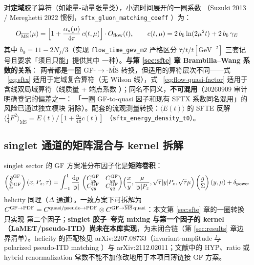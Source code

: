 \documentclass[11pt,a4paper]{ctexart}
\newcommand{\MSbarM}{\overline{\text{MS}}}
\newcommand{\abs}[1]{\lvert #1\rvert}
\newcommand{\code}[1]{\texttt{#1}}
\newcommand{\zzh}{\widehat{\tau}}
\begin{document}
对\textbf{定域}胶子算符（如能量-动量张量类），小流时间展开的一圈系数
（Suzuki 2013 / Mereghetti 2022 惯例，\code{sftx\_gluon\_matching\_coeff}
）为：
\begin{equation}\label{eq:sftx}
O_{\MSbarM}(\mu) = \Bigl[1 + \frac{\alpha_s(\mu)}{4\pi}\,c(t,\mu)\Bigr]
\cdot O_{\rm flow}(t),
\qquad
c(t,\mu) = 2\,b_0\ln(2\mu^2 t) + 2\,b_0\,\gamma_E
\end{equation}
其中 $b_0=11-2N_f/3$（实现 \code{flow\_time\_gev\_m2} 严格区分
$\zzh$/$t$/$t[\mathrm{GeV}^{-2}]$ 三套记号且要求「须且只能」提供其中
一种）。\textbf{与第 \ref{sec:sfte} 章 Brambilla--Wang 系数的关系}：
两者都是一圈 GF-$\to$-$\MSbarM$ 转换，但适用的算符层次不同——式
~\eqref{eq:sftx} 适用于定域复合算符（无 Wilson 线），式
~\eqref{eq:flow-quasi-factor} 适用于含线双局域算符（线质量 + 端点系数
）；同名不同义，\textbf{不可混用}（20260909 审计明确登记的偏差之一：
「一圈 GF-to-quasi 因子和现有 SFTX 系数同名混用」的风险已通过独立模块
消除）。配套的流观测量转换：$\langle E(t)\rangle$ 的 SFTE 反解
$\langle\frac14 F^2\rangle_{\MSbarM} = E(t)/[1+\frac{\alpha_s}{4\pi}c(t)]$
（\code{sftx\_energy\_density\_t0}）。

\subsection{singlet 通道的矩阵混合与 kernel 拆解}

singlet sector 的 GF 方案准分布因子化是\textbf{矩阵卷积}：
\begin{equation}
\begin{pmatrix}\tilde g^{\rm GF}\\ \tilde\Sigma^{\rm GF}\end{pmatrix}
(x,P_z,\tau) = \int_{-1}^{1}\frac{\mathrm{d}y}{\abs{y}}\,
\begin{pmatrix}
C_{gg}^{\rm GF} & C_{gq}^{\rm GF}\\
C_{qg}^{\rm GF} & C_{qq}^{\rm GF}
\end{pmatrix}
\!\Bigl(\frac{x}{y},\frac{\mu}{\abs{y}P_z},
\sqrt{\tau}\abs{y}P_z,\sqrt{\tau}\mu\Bigr)
\begin{pmatrix}g\\ \Sigma\end{pmatrix}(y,\mu)
+\delta_{\rm power}
\end{equation}
helicity 同理（$\Delta$ 通道）。一致方案下可拆解为
$C^{\rm GF\to PDF}=C^{\rm quasi/pseudo\to PDF}\otimes
C^{\rm GF\to\MSbarM\,quasi}$：本文第 \ref{sec:sfte} 章的一圈转换只实现
第二个因子；\textbf{singlet 胶子--夸克 mixing 与第一个因子的 kernel
（LaMET/pseudo-ITD）尚未在本库实现}，为未闭合链（第
\ref{sec:results} 章边界清单）。helicity 的匹配核见
arXiv:2207.08733（invariant-amplitude 与 polarized pseudo-ITD matching
）与 arXiv:2112.02011；文献中的 HYP、ratio 或 hybrid renormalization
常数不能不加修改地用于本项目薄链接 GF 方案。
\end{document}
